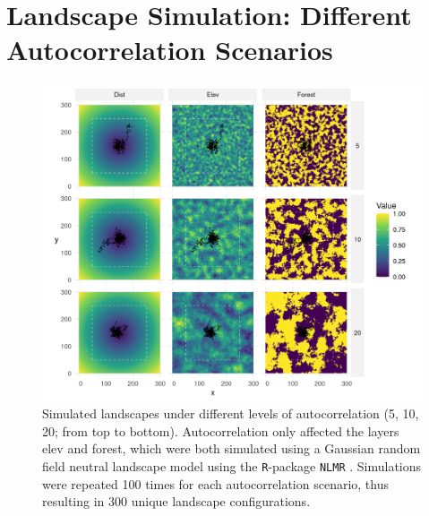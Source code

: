 \documentclass[../FinalThesis.tex]{subfiles}
\begin{document}
\newpage
\section{Landscape Simulation: Different Autocorrelation Scenarios}
\begin{figure}[!ht]
  \begin{center}
  \includegraphics[width = \textwidth]{Figures/CovariatesAppendix.png}
  \caption{Simulated landscapes under different levels of autocorrelation (5,
  10, 20; from top to bottom). Autocorrelation only affected the layers
  \textsf{elev} and \textsf{forest}, which were both simulated using a Gaussian
  random field neutral landscape model \citep{Schlather.2015} using the
  \texttt{R}-package \texttt{NLMR} \citep{Sciaini.2018}. Simulations were
  repeated 100 times for each autocorrelation scenario, thus resulting in 300
  unique landscape configurations.}
  \label{SimulatedCovariates}
  \end{center}
\end{figure}

\newpage
\end{document}
